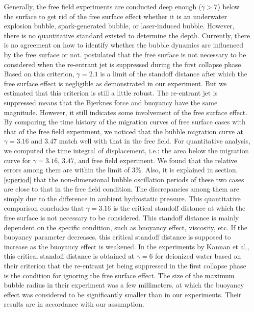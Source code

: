 \documentclass[%
 aip,
 amsmath,amssymb,
 reprint,%
]{revtex4-1}
\begin{document}
{Generally, the free field experiments are conducted deep enough ($\gamma>7$) below the surface to get rid of the free surface effect whether it is an underwater explosion bubble, spark-generated bubble, or laser-induced bubble. However, there is no quantitative standard existed to determine the depth. Currently, there is no agreement on how to identify whether the bubble dynamics are influenced by the free surface or not. \citet{RN2735} postulated that the free surface is not necessary to be considered when the re-entrant jet is suppressed during the first collapse phase. Based on this criterion, $\gamma=2.1$ is a limit of the standoff distance after which the free surface effect is negligible as demonstrated in our experiment. But we estimated that this criterion is still a little robust. The re-entrant jet is suppressed means that the Bjerknes force and buoyancy have the same magnitude. However, it still indicates some involvement of the free surface effect. By comparing the time history of the migration curves of free surface cases with that of the free field experiment, we noticed that the bubble migration curve at $\gamma=3.16$ and $3.47$ match well with that in the free field. For quantitative analysis, we computed the time integral of displacement, i.e.: the area below the migration curve for $\gamma=3.16, \, 3.47$, and free field experiment. We found that the relative errors among them are within the limit of $3\%$. Also, it is explained in section.\ref{s:period} that the non-dimensional bubble oscillation periods of these two cases are close to that in the free field condition. The discrepancies among them are simply due to the difference in ambient hydrostatic pressure. This quantitative comparison concludes that $\gamma=3.16$ is the critical standoff distance at which  the free surface is not necessary to be considered. This standoff distance is mainly dependent on the specific condition, such as buoyancy effect, viscosity, etc. If the buoyancy parameter decreases, this critical standoff distance is supposed to increase as the buoyancy effect is weakened. In the experiments by Kannan et al.\cite{RN2735}, this critical standoff distance is obtained at $\gamma=6$ for deionized water based on their criterion that the re-entrant jet being suppressed in the first collapse phase is the condition for ignoring the free surface effect. The size of the maximum bubble radius in their experiment was a few millimeters, at which the buoyancy effect was considered to be significantly smaller than in our experiments. Their results are in accordance with our assumption. 

}
\end{document}
